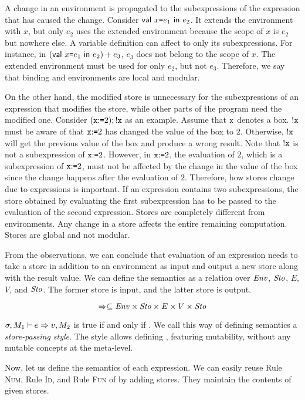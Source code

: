 A change in an environment is propagated to the subexpressions of the expression
that has caused the change. Consider $\textsf{val}\ x\texttt{=} e_1\ \textsf{in}\ e_2$.
It extends the environment with $x$, but only $e_2$ uses the
extended environment because the scope of $x$ is $e_2$ but nowhere else.
A variable definition can affect to only its subexpressions.
For instance, in $(\textsf{val}\ x\texttt{=} e_1\ \textsf{in}\ e_2)+e_3$, $e_3$ does not belong to
the scope of $x$. The extended environment must be used for only $e_2$, but not
$e_3$. Therefore, we say that binding and environments are local and modular.

On the other hand, the modified store is unnecessary for the subexpressions of an
expression that modifies the store, while other parts of the program need
the modified one. Consider $(\texttt{x}{:}\texttt{=}2);!\texttt{x}$ as an example.
Assume that $\texttt{x}$ denotes a box.
$!\texttt{x}$ must be aware of that $\texttt{x}{:}\texttt{=}2$ has changed the value of the box
to $2$. Otherwise, $!\texttt{x}$ will get the previous value of the box and
produce a wrong result. Note that $!\texttt{x}$ is not a subexpression of
$\texttt{x}{:}\texttt{=}2$. However, in $\texttt{x}{:}\texttt{=}2$, the evaluation of $2$, which is a
subexpression of $\texttt{x}{:}\texttt{=}2$, must not be affected by the change in the value
of the box since the change happens after the evaluation of $2$. Therefore,
how stores change due to expressions is important. If an expression contains two
subexpressions, the store obtained by evaluating the first subexpression has to be
passed to the evaluation of the second expression. Stores are completely
different from environments. Any change in a store affects the entire remaining
computation. Stores are global and not modular.

From the observations, we can conclude that evaluation of an expression needs to
take a store in addition to an environment as input and output a new store along
with the result value. We can define the semantics as a
relation over $\mbox{\emph{Env}}$, $\mbox{\emph{Sto}}$, $E$, $V$, and $\mbox{\emph{Sto}}$.
The former store is input, and the latter store is output.

\[\Rightarrow\subseteq\mbox{\emph{Env}}\times\mbox{\emph{Sto}}\times E\times V\times\mbox{\emph{Sto}}\]

$\sigma,M_{1}\vdash e\Rightarrow v,M_{2}$ is true if and only if .
We call this way of defining semantics a \textit{store-passing
style}. The style allows defining \lang, featuring
mutability, without any mutable concepts at the meta-level.

Now, let us define the semantics of each expression. We can easily reuse Rule
\textsc{Num}, Rule \textsc{Id}, and Rule \textsc{Fun} of \lang by adding stores.
They maintain the contents of given stores.

